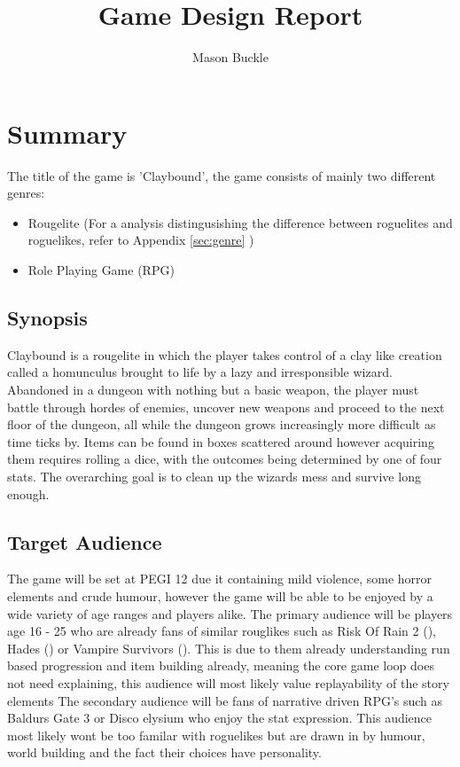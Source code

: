 \documentclass[progress]{cmpreport}
\title{Game Design Report}
\author{Mason Buckle}
\begin{document}
\tableofcontents
\clearpage

\section{Summary}
The title of the game is 'Claybound', the game consists of mainly two different genres: \cite{}
\begin{itemize}
    \item Rougelite (For a analysis distingusishing the difference between roguelites and roguelikes, refer to Appendix \ref{sec:genre} )
    \item Role Playing Game (RPG)
\end{itemize}

\subsection{Synopsis}
Claybound is a rougelite in which the player takes control of a clay like creation called a homunculus brought to life by a lazy and irresponsible wizard.
Abandoned in a dungeon with nothing but a basic weapon, the player must battle through hordes of enemies, uncover new weapons and proceed to the next floor of the dungeon, all while the dungeon grows 
increasingly more difficult as time ticks by. Items can be found in boxes scattered around however acquiring them requires rolling a dice, with the outcomes being determined by one of four stats. The overarching goal is to clean up the wizards mess and survive long enough. 

\subsection{Target Audience}
The game will be set at PEGI 12 due it containing mild violence, some horror elements and crude humour, however the game will be able to be enjoyed by a wide variety of age ranges and players alike.
The primary audience will be players age 16 - 25 who are already fans of similar rouglikes such as Risk Of Rain 2 (\cite{ror2}), Hades (\cite{steam:Hades}) or Vampire Survivors (\cite{vampiresurvivors}). This is due to them already understanding run based progression and item building already,
meaning the core game loop does not need explaining, this audience will most likely value replayability of the story elements
\newline
\newline
The secondary audience will be fans of narrative driven RPG's such as Baldurs Gate 3 or Disco elysium who enjoy the stat expression. This audience most likely wont be too familar with roguelikes but are drawn in by humour, world building and the fact their 
choices have personality.
\clearpage
\end{document}
